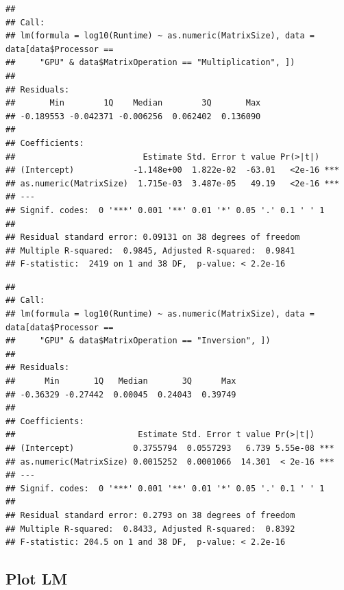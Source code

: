 \documentclass[
]{article}
\newenvironment{Shaded}{\begin{snugshade}}{\end{snugshade}}
\newcommand{\KeywordTok}[1]{\textcolor[rgb]{0.13,0.29,0.53}{\textbf{#1}}}
\newcommand{\NormalTok}[1]{#1}
\newcommand{\OperatorTok}[1]{\textcolor[rgb]{0.81,0.36,0.00}{\textbf{#1}}}
\newcommand{\StringTok}[1]{\textcolor[rgb]{0.31,0.60,0.02}{#1}}
\begin{document}
\begin{verbatim}
## 
## Call:
## lm(formula = log10(Runtime) ~ as.numeric(MatrixSize), data = data[data$Processor == 
##     "GPU" & data$MatrixOperation == "Multiplication", ])
## 
## Residuals:
##       Min        1Q    Median        3Q       Max 
## -0.189553 -0.042371 -0.006256  0.062402  0.136090 
## 
## Coefficients:
##                          Estimate Std. Error t value Pr(>|t|)    
## (Intercept)            -1.148e+00  1.822e-02  -63.01   <2e-16 ***
## as.numeric(MatrixSize)  1.715e-03  3.487e-05   49.19   <2e-16 ***
## ---
## Signif. codes:  0 '***' 0.001 '**' 0.01 '*' 0.05 '.' 0.1 ' ' 1
## 
## Residual standard error: 0.09131 on 38 degrees of freedom
## Multiple R-squared:  0.9845, Adjusted R-squared:  0.9841 
## F-statistic:  2419 on 1 and 38 DF,  p-value: < 2.2e-16
\end{verbatim}

\begin{Shaded}
\end{Shaded}

\begin{verbatim}
## 
## Call:
## lm(formula = log10(Runtime) ~ as.numeric(MatrixSize), data = data[data$Processor == 
##     "GPU" & data$MatrixOperation == "Inversion", ])
## 
## Residuals:
##      Min       1Q   Median       3Q      Max 
## -0.36329 -0.27442  0.00045  0.24043  0.39749 
## 
## Coefficients:
##                         Estimate Std. Error t value Pr(>|t|)    
## (Intercept)            0.3755794  0.0557293   6.739 5.55e-08 ***
## as.numeric(MatrixSize) 0.0015252  0.0001066  14.301  < 2e-16 ***
## ---
## Signif. codes:  0 '***' 0.001 '**' 0.01 '*' 0.05 '.' 0.1 ' ' 1
## 
## Residual standard error: 0.2793 on 38 degrees of freedom
## Multiple R-squared:  0.8433, Adjusted R-squared:  0.8392 
## F-statistic: 204.5 on 1 and 38 DF,  p-value: < 2.2e-16
\end{verbatim}

\hypertarget{plot-lm}{%
\subsection{Plot LM}\label{plot-lm}}
\end{document}
